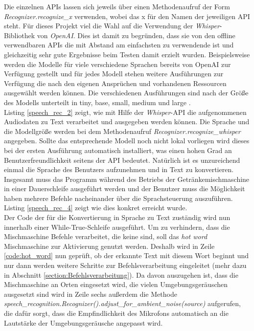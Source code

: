 Die einzelnen \ac{API}s lassen sich jeweils über einen Methodenaufruf der Form \textit{Recognizer.recognize\_x} verwenden, wobei das \glqq{}x\grqq{} für den Namen der jeweiligen \ac{API} steht. Für dieses Projekt viel die Wahl auf die Verwendung der \textit{Whisper}-Bibliothek von \textit{OpenAI}. Dies ist damit zu begründen, dass sie von den offline verwendbaren \ac{API}s die mit Abstand am einfachsten zu verwendende ist und gleichzeitig sehr gute Ergebnisse beim Testen damit erzielt wurden. Beispielsweise werden die Modelle für viele verschiedene Sprachen bereits von OpenAI zur Verfügung gestellt und für jedes Modell stehen weitere Ausführungen zur Verfügung die nach den eigenen Ansprüchen und vorhandenen Ressourcen ausgewählt werden können. Die verschiedenen Ausführungen sind nach der \glqq{}Größe\grqq{} des Modells unterteilt in \glqq{}tiny\grqq{}, \glqq{}base\grqq{}, \glqq{}small\grqq{}, \glqq{}medium\grqq{} und \glqq{}large\grqq{} \cite{whisper_repo}.\\

Listing \ref{speech_rec_2} zeigt, wie mit Hilfe der \textit{Whisper}-\ac{API} die aufgenommenen Audiodaten zu Text verarbeitet und ausgegeben werden können. Die Sprache und die Modellgröße werden bei dem Methodenaufruf \textit{Recognizer.recognize\_whisper} angegeben. Sollte das entsprechende Modell noch nicht lokal vorliegen wird dieses bei der ersten Ausführung automatisch installiert, was einen hohen Grad an Benutzerfreundlichkeit seitens der \ac{API} bedeutet. Natürlich ist es unzureichend einmal die Sprache des Benutzers aufzunehmen und in Text zu konvertieren. Insgesamt muss das Programm während des Betriebs der Getränkemischmaschine in einer Dauerschleife ausgeführt werden und der Benutzer muss die Möglichkeit haben mehrere Befehle nacheinander über die Sprachsteuerung auszuführen. Listing \ref{speech_rec_4} zeigt wie dies konkret erreicht wurde.\\
 
Der Code der für die Konvertierung in Sprache zu Text zuständig wird nun innerhalb einer While-True-Schleife ausgeführt. Um zu verhindern, dass die Mischmaschine Befehle verarbeitet, die keine sind, soll das \textit{hot word} \glqq{}Mischmaschine\grqq{} zur Aktivierung genutzt werden. Deshalb wird in Zeile \ref{code:hot_word} nun geprüft, ob der erkannte Text mit diesem Wort beginnt und nur dann werden weitere Schritte zur Befehlsverarbeitung eingeleitet (mehr dazu in Abschnitt \ref{section:Befehlsverarbeitung}). Da davon auszugehen ist, dass die Mischmaschine an Orten eingesetzt wird, die vielen Umgebungsgeräuschen ausgesetzt sind wird in Zeile sechs außerdem die Methode \textit{speech\_recognition.Recognizer().adjust\_for\_ambient\_noise(source)} aufgerufen, die dafür sorgt, dass die Empfindlichkeit des Mikrofons automatisch an die Lautstärke der Umgebungsgeräusche angepasst wird.
